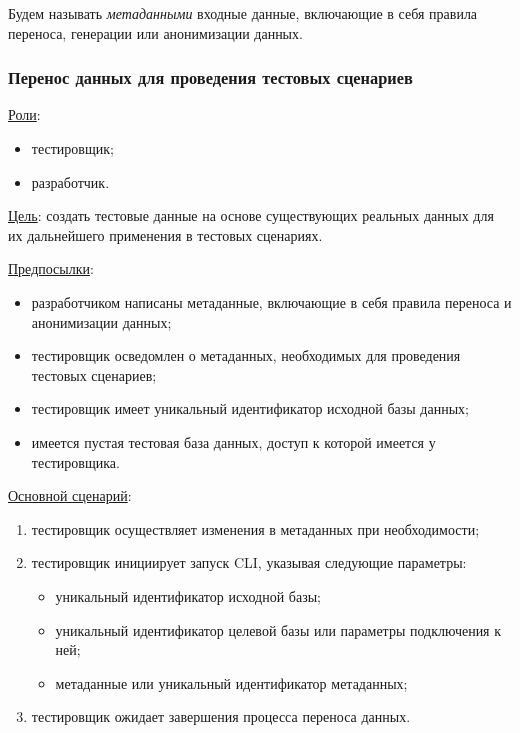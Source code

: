 Будем называть \textit{метаданными} входные данные, включающие в себя правила переноса, генерации или анонимизации данных.

\subsubsection{Перенос данных для проведения тестовых сценариев}

\underline{Роли}:

\begin{itemize}
    \item тестировщик;
    \item разработчик.
\end{itemize}

\underline{Цель}: создать тестовые данные на основе существующих реальных данных для их дальнейшего применения в тестовых сценариях.

\underline{Предпосылки}:

\begin{itemize}
    \item разработчиком написаны метаданные, включающие в себя правила переноса и анонимизации данных;
    \item тестировщик осведомлен о метаданных, необходимых для проведения тестовых сценариев;
    \item тестировщик имеет уникальный идентификатор исходной базы данных;
    \item имеется пустая тестовая база данных, доступ к которой имеется у тестировщика.
\end{itemize}

\underline{Основной сценарий}:

\begin{enumerate}
    \item тестировщик осуществляет изменения в метаданных при необходимости;
    \item тестировщик инициирует запуск CLI, указывая следующие параметры:
    \begin{itemize}
        \item уникальный идентификатор исходной базы;
        \item уникальный идентификатор целевой базы или параметры подключения к ней;
        \item метаданные или уникальный идентификатор метаданных;
    \end{itemize}
    \item тестировщик ожидает завершения процесса переноса данных.
\end{enumerate}

